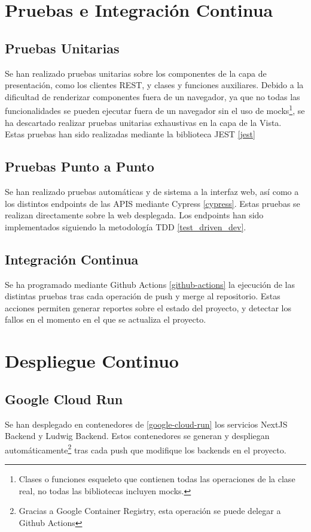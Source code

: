 \section{Pruebas e Integración Continua}
\subsection{Pruebas Unitarias}
Se han realizado pruebas unitarias sobre los componentes de la capa de presentación, como los clientes REST, y clases y funciones auxiliares. 
Debido a la dificultad de renderizar componentes fuera de un navegador, ya que no todas las funcionalidades se pueden ejecutar fuera de un navegador sin el uso de mocks\footnote{Clases o funciones esqueleto que contienen todas las operaciones de la clase real, no todas las bibliotecas incluyen mocks.}, se ha descartado realizar pruebas unitarias exhaustivas en la capa de la Vista.\\
Estas pruebas han sido realizadas mediante la biblioteca JEST \ref{jest}

\subsection{Pruebas Punto a Punto}
Se han realizado pruebas automáticas y de sistema a la interfaz web, así como a los distintos endpoints de las APIS mediante Cypress \ref{cypress}. Estas pruebas se realizan directamente sobre la web desplegada.
Los endpoints han sido implementados siguiendo la metodología TDD \ref{test_driven_dev}.

\subsection{Integración Continua}
Se ha programado mediante Github Actions \ref{github-actions} la ejecución de las distintas pruebas tras cada operación de push y merge al repositorio. Estas acciones permiten generar reportes sobre el estado del proyecto, y detectar los fallos en el momento en el que se actualiza el proyecto. 

\section{Despliegue Continuo}\label{deployment}
\subsection{Google Cloud Run}
Se han desplegado en contenedores de \ref{google-cloud-run} los servicios NextJS Backend y Ludwig Backend.
Estos contenedores se generan y despliegan automáticamente\footnote{Gracias a Google Container Registry, esta operación se puede delegar a Github Actions} tras cada push que modifique los backends en el proyecto.

